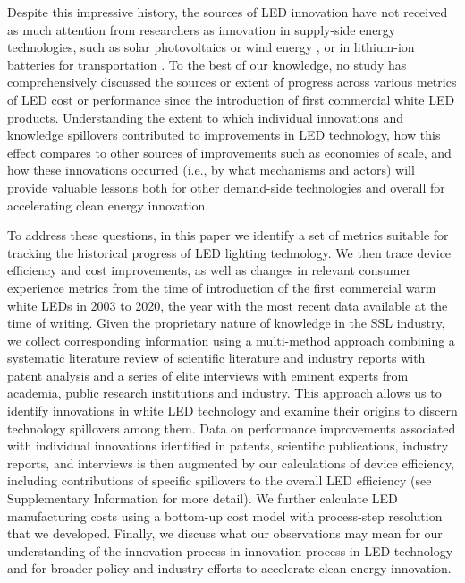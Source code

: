 \documentclass[journal=jacsat,manuscript=article]{achemso}
\begin{document}
Despite this impressive history, the sources of LED innovation have not received as much attention from researchers as innovation in supply-side  energy technologies, such as solar photovoltaics  \cite{kavlak2018evaluating} or wind energy \cite{qiu2012price,jennings2020policy}, or in lithium-ion batteries for transportation \cite{Ziegler2021,Stephan2021}. To the best of our knowledge, no study has comprehensively discussed the sources or extent of progress across various metrics of LED cost or performance since the introduction of first commercial white LED products.  Understanding the extent to which individual innovations and knowledge spillovers  contributed to improvements in LED technology, how this effect compares to other sources of improvements such as economies of scale, and how these innovations occurred (i.e., by what mechanisms and actors) will provide valuable lessons both for other demand-side technologies and overall for accelerating clean energy innovation.

To address these questions, in this paper we identify a set of metrics suitable for tracking the historical progress of LED lighting technology. We then trace device efficiency and cost improvements, as well as changes in relevant consumer experience metrics from the time of introduction of the first commercial warm white LEDs in 2003 to 2020, the year with the most recent data available at the time of writing. Given the proprietary nature of knowledge in the SSL industry, we collect corresponding information using a multi-method approach combining a systematic literature review of scientific literature and industry reports with patent analysis and a series of elite interviews \cite{tansey2009process} with eminent experts from academia, public research institutions and industry. This approach allows us to identify innovations in white LED technology and examine their origins to discern technology spillovers among them. Data on performance improvements associated with individual innovations identified in patents, scientific publications, industry reports, and interviews is then augmented  by our calculations of device efficiency, including contributions of specific spillovers to the overall LED efficiency (see Supplementary Information for more detail). We further calculate LED manufacturing costs using a bottom-up cost model with process-step resolution that we developed. Finally, we discuss what our observations may mean for our understanding of the innovation process in innovation process in LED technology and for broader policy and industry efforts to accelerate clean energy innovation.
\end{document}
